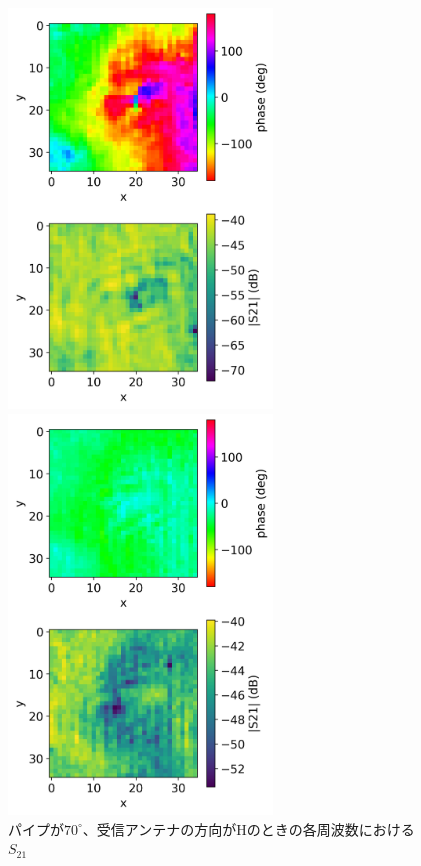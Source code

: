 \documentclass[11pt,a4paper,uplatex]{ujarticle}
\begin{document}
\begin{figure}[tbp]
    \begin{minipage}[b]{0.495\textwidth}
      \centering
      \includegraphics[keepaspectratio, width=70mm]{Images/python/rowdata/130.png}
    \end{minipage}
    \begin{minipage}[b]{0.495\textwidth}
      \centering
      \includegraphics[keepaspectratio, width=70mm]{Images/python/rowdata/180.png}
    \end{minipage}
    \caption{パイプが$70^{\circ}$、受信アンテナの方向がHのときの各周波数における$S_{21}$}
  \end{figure}
\end{document}
